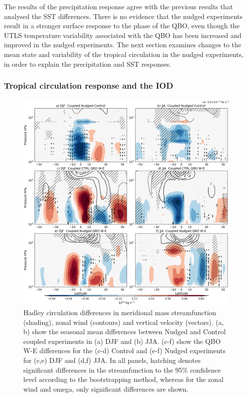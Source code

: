 The results of the precipitation response agree with the previous results that analysed the SST differences. There is no evidence that the nudged experiments result in a stronger surface response to the phase of the QBO, even though the UTLS temperature variability associated with the QBO has been increased and improved in the nudged experiments. 
The next section examines changes to the mean state and variability of the tropical circulation in the nudged experiments, in order to explain the precipitation and SST responses.

\subsubsection{Tropical circulation response and the IOD}

\begin{figure}[t!]
\centering
 \includegraphics[width=\linewidth]{figures/suite_coupledhadley.png}
\caption[Hadley circulation in coupled nudged experiments.]{Hadley circulation differences in meridional mass streamfunction (shading), zonal wind (contours) and vertical velocity (vectors). (a, b) show the seasonal mean differences between Nudged and Control coupled experiments in (a) DJF and (b) JJA. (c-f) show the QBO W-E differences for the (c-d) Control and (e-f) Nudged experiments for (c,e) DJF and (d,f) JJA. In all panels, hatching denotes significant differences in the streamfunction to the 95\% confidence level according to the bootstrapping method, whereas for the zonal wind and omega, only significant differences are shown.}
\label{fig:hadley_coupled}
\end{figure}

